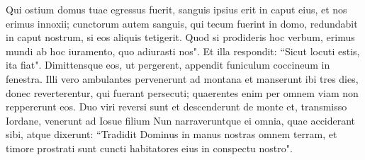 \begin{biblechapter}
\verse Qui ostium domus tuae egressus fuerit, sanguis ipsius erit in caput eius, et nos erimus innoxii; cunctorum autem sanguis, qui tecum fuerint in domo, redundabit in caput nostrum, si eos aliquis tetigerit. 
\verse Quod si prodideris hoc verbum, erimus mundi ab hoc iuramento, quo adiurasti nos". 
\verse Et illa respondit: “Sicut locuti estis, ita fiat". Dimittensque eos, ut pergerent, appendit funiculum coccineum in fenestra. 
\verse Illi vero ambulantes pervenerunt ad montana et manserunt ibi tres dies, donec reverterentur, qui fuerant persecuti; quaerentes enim per omnem viam non reppererunt eos. 
\verse Duo viri reversi sunt et descenderunt de monte et, transmisso Iordane, venerunt ad Iosue filium Nun narraveruntque ei omnia, quae acciderant sibi, 
\verse atque dixerunt: “Tradidit Dominus in manus nostras omnem terram, et timore prostrati sunt cuncti habitatores eius in conspectu nostro". 
\end{biblechapter}

